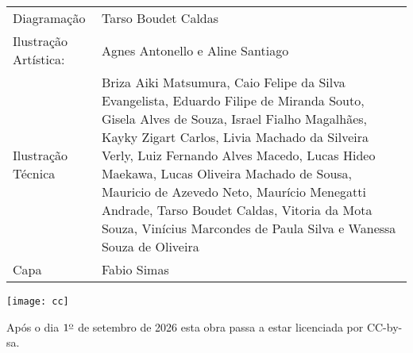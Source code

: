 {\begin{center}
\begin{tabular}{p{}p{}}
Diagramação & Tarso Boudet Caldas \\

Ilustração \newline Artística: & Agnes Antonello e Aline Santiago \\

Ilustração \newline Técnica & 
Briza Aiki Matsumura,
Caio Felipe da Silva Evangelista,
Eduardo Filipe de Miranda Souto,
Gisela Alves de Souza,
Israel Fialho Magalhães, 
Kayky Zigart Carlos,
Livia Machado da Silveira Verly,
Luiz Fernando Alves Macedo,
Lucas Hideo Maekawa,
Lucas Oliveira Machado de Sousa,
Mauricio de Azevedo Neto,
Maurício Menegatti Andrade,
Tarso Boudet Caldas,
Vitoria da Mota Souza,
Vinícius Marcondes de Paula Silva e 
Wanessa Souza de Oliveira\\

Capa & Fabio Simas
\end{tabular}
\vspace{.2cm}

\texttt{[image: cc]}

Após o dia $1^{\textrm{\underline{o}}}$ de setembro de 2026 esta obra passa a estar licenciada por CC-by-sa.

\end{center}
}
\setcounter{page}{1}
\cleardoublepage

